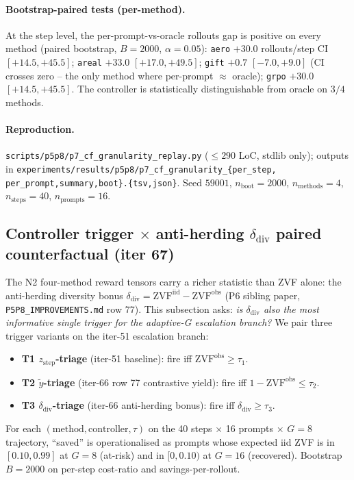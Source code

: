 \documentclass{article}
\begin{document}
\paragraph{Bootstrap-paired tests (per-method).}
At the step level, the per-prompt-vs-oracle rollouts gap is
positive on every method (paired bootstrap, $B{=}2000$,
$\alpha{=}0.05$):
\texttt{aero} $+30.0$ rollouts/step CI $[+14.5, +45.5]$;
\texttt{areal} $+33.0$ $[+17.0, +49.5]$; \texttt{gift} $+0.7$
$[-7.0, +9.0]$ (CI crosses zero -- the only method where
per-prompt $\approx$ oracle); \texttt{grpo} $+30.0$ $[+14.5,
+45.5]$. The controller is statistically distinguishable from
oracle on $3/4$ methods.

\paragraph{Reproduction.}
\texttt{scripts/p5p8/p7\_cf\_granularity\_replay.py}
($\leq 290$ LoC, stdlib only); outputs in
\texttt{experiments/results/p5p8/p7\_cf\_granularity\_\{per\_step,
per\_prompt,summary,boot\}.\{tsv,json\}}. Seed $59001$,
$n_{\mathrm{boot}}{=}2000$, $n_{\mathrm{methods}}{=}4$,
$n_{\mathrm{steps}}{=}40$, $n_{\mathrm{prompts}}{=}16$.
\subsection{Controller trigger $\times$ anti-herding $\delta_{\mathrm{div}}$
paired counterfactual (iter 67)}
\label{sec:p7-controller-antiherding}

The N2 four-method reward tensors carry a richer statistic than ZVF alone:
the anti-herding diversity bonus $\delta_{\mathrm{div}} = \mathrm{ZVF}^{\mathrm{iid}}
- \mathrm{ZVF}^{\mathrm{obs}}$ (P6 sibling paper, \texttt{P5P8\_IMPROVEMENTS.md} row 77).
This subsection asks: \emph{is $\delta_{\mathrm{div}}$ also the most informative
single trigger for the adaptive-G escalation branch?} We pair three
trigger variants on the iter-51 escalation branch:
\begin{itemize}
    \item \textbf{T1 $z_{\mathrm{step}}$-triage} (iter-51 baseline):
        fire iff $\mathrm{ZVF}^{\mathrm{obs}} \geq \tau_1$.
    \item \textbf{T2 $\tilde{y}$-triage} (iter-66 row 77 contrastive yield):
        fire iff $1 - \mathrm{ZVF}^{\mathrm{obs}} \leq \tau_2$.
    \item \textbf{T3 $\delta_{\mathrm{div}}$-triage} (iter-66 anti-herding bonus):
        fire iff $\delta_{\mathrm{div}} \geq \tau_3$.
\end{itemize}
For each $(\mathrm{method}, \mathrm{controller}, \tau)$ on the
40 steps $\times$ 16 prompts $\times$ $G{=}8$ trajectory,
``saved'' is operationalised as prompts whose expected iid ZVF is in
$[0.10, 0.99]$ at $G{=}8$ (at-risk) and in $[0, 0.10)$ at $G{=}16$ (recovered).
Bootstrap $B{=}2000$ on per-step cost-ratio and savings-per-rollout.
\end{document}
